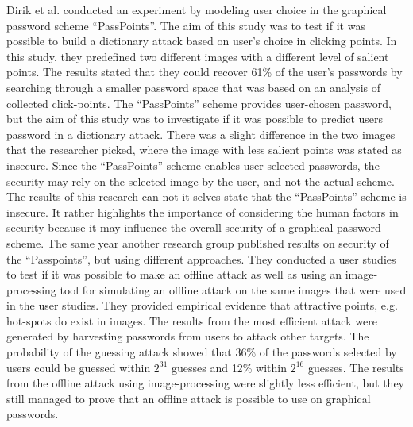   Dirik et al. \cite{Dirik} conducted an experiment by modeling user choice in the graphical password scheme ``PassPoints''. The aim of this study was to test if it was possible to build a dictionary attack based on user's choice in clicking points. In this study, they predefined two different images with a different level of salient points. The results stated that they could recover 61\% of the user's passwords by searching through a smaller password space that was based on an analysis of collected click-points. The ``PassPoints'' scheme provides user-chosen password, but the aim of this study was to investigate if it was possible to predict users password in a dictionary attack. There was a slight difference in the two images that the researcher picked, where the image with less salient points was stated as insecure. Since the ``PassPoints'' scheme enables user-selected passwords, the security may rely on the selected image by the user, and not the actual scheme. The results of this research can not it selves state that the ``PassPoints'' scheme is insecure. It rather highlights the importance of considering the human factors in security because it may influence the overall security of a graphical password scheme. The same year another research group published \cite{Thorpe2} results on security of the ``Passpoints'', but using different approaches. They conducted a user studies to test if it was possible to make an offline attack as well as using an image-processing tool for simulating an offline attack on the same images that were used in the user studies. They provided empirical evidence that attractive points, e.g. hot-spots do exist in images. The results from the most efficient attack were generated by harvesting passwords from users to attack other targets. The probability of the guessing attack showed that 36\% of the passwords selected by users could be guessed within $2^{31}$ guesses and 12\% within $2^{16}$ guesses. The results from the offline attack using image-processing were slightly less efficient, but they still managed to prove that an offline attack is possible to use on graphical passwords.   


